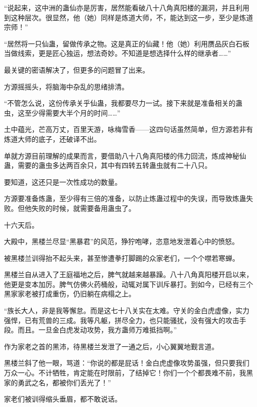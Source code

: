 
\begin{this_body}

“说起来，这中洲的蛊仙亦是厉害，居然能看破八十八角真阳楼的漏洞，并且利用到这种层次。很显然，他（她）同样是炼道大师，不，能达到这一步，至少是炼道宗师！”

“居然将一只仙蛊，留做传承之物。这是真正的仙藏！他（她）利用赝品灰白石板当做线索，更是匠心独运，想法奇妙。不知道是想选择什么样的继承者……”

最关键的密语解决了，但更多的问题冒了出来。

方源摇摇头，将脑海中杂乱的思绪排清。

“不管怎么说，这份传承关乎仙蛊，我都要尽力一试。接下来就是准备相关的蛊虫，这至少得需要大半个月的时间……”

土中蕴光，芒高万丈，百里天游，咏梅雪香——这四句话虽然简单，但方源若非有炼道大师的底子，还破译不出。

单就方源目前理解的成果而言，要借助八十八角真阳楼的伟力回流，炼成神秘仙蛊，需要的蛊虫多达两百余只，其中有四转五转蛊虫就有二十八只。

要知道，这还只是一次性成功的数量。

方源要准备炼蛊，至少得有三倍的准备，以防止炼蛊过程中的失误，而导致炼蛊失败。但他失败的时候，就需要备用蛊虫了。

十六天后。

大殿中，黑楼兰尽显“黑暴君”的风范，狰狞咆哮，恣意地发泄着心中的愤怒。

被黑楼兰训得抬不起头来，甚至惨遭拳打脚踢的众家老们，一个个噤若寒蝉。

黑楼兰自从进入了王庭福地之后，脾气就越来越暴躁。八十八角真阳楼开启以来，他更是变本加厉。脾气仿佛火药桶般，动辄对属下训斥暴打。到如今，已经有三个黑家家老被打成重伤，仍旧躺在病榻之上。

“族长大人，非是我等懈怠。而是这七十八关实在太难。守关的金白虎虚像，实力强悍，已有荒兽的三成。我等凡躯，拼尽全力，也只能骚扰，没有强大的攻击手段。而且。一旦金白虎发动攻势，我方蛊师万难抵挡啊。”

作为家老之首的黑沛，待黑楼兰发泄了一通之后，小心翼翼地觐言道。

黑楼兰斜了他一眼，骂道：“你说的都是屁话！金白虎虚像攻势虽强，但只要我们万众一心。不计牺牲，肯定能在时限前，了结掉它！你们一个个都畏难不前，我黑家的勇武之名，都被你们丢光了！”

家老们被训得缩头垂眉，都不敢说话。


\end{this_body}
